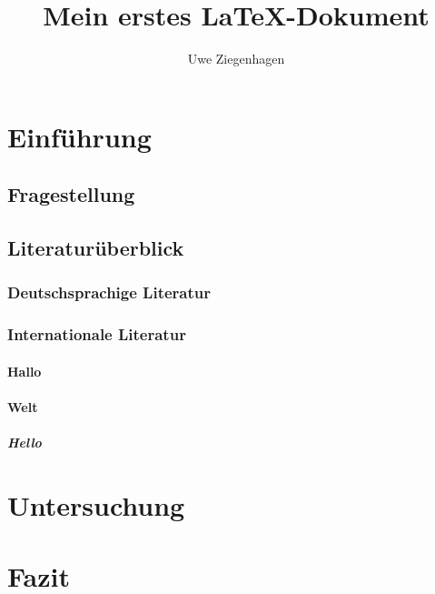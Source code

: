\documentclass[12pt]{scrartcl}
\author{Uwe Ziegenhagen}
\title{Mein erstes \LaTeX-Dokument}
\begin{document}
\maketitle

\tableofcontents


\clearpage

\section{Einführung}
\subsection{Fragestellung}

\blindtext[5]

\subsection{Literaturüberblick}
\subsubsection{Deutschsprachige Literatur}

\blindtext[5]

\subsubsection{Internationale Literatur}

\blindtext[5]

\paragraph{Hallo} \blindtext[5]

\paragraph{Welt} \blindtext[5]

\subparagraph{Hello} \blindtext[5]


\section{Untersuchung}

\blindtext[5]

\section{Fazit}

\blindtext[5]
\end{document}
